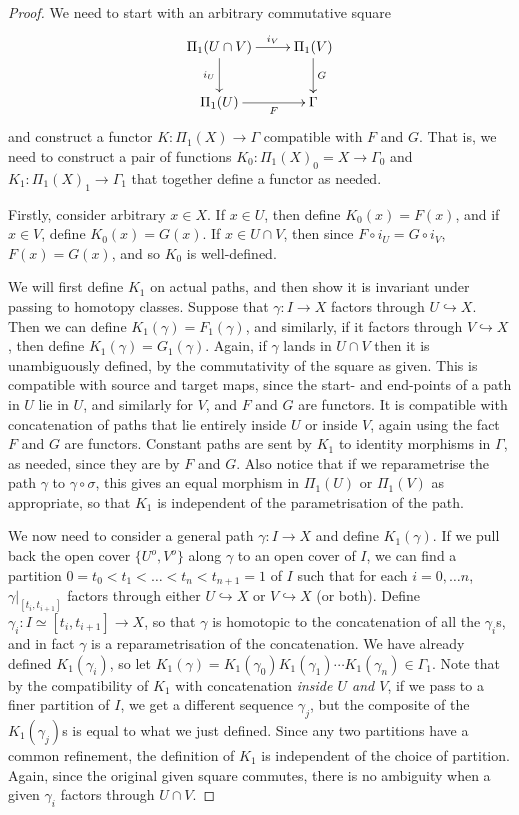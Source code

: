 \documentclass{tufte-handout}
\def\into {\hookrightarrow}
\theoremstyle{definition}
\begin{document}
\begin{proof}
We need to start with an arbitrary commutative square
\[
	\xymatrix{
		\Pi_1(U\cap V) \ar[r]^-{i_V} \ar[d]_{i_U} & \Pi_1(V) \ar[d]^G\\
		\Pi_1(U) \ar[r]_-F & \Gamma
	}
\]
and construct a functor $K\colon \Pi_1(X) \to \Gamma$ compatible with $F$ and $G$. That 
is, we need to construct a pair of functions $K_0\colon \Pi_1(X)_0 = X \to \Gamma_0$ and 
$K_1\colon \Pi_1(X)_1 \to \Gamma_1$ that together define a functor as needed.

Firstly, consider arbitrary $x\in X$. If $x\in U$, then define $K_0(x) = F(x)$, and if 
$x\in V$, define $K_0(x) = G(x)$. If $x\in U\cap V$, then since $F\circ i_U = G\circ 
i_V$, $F(x) = G(x)$, and so $K_0$ is well-defined.

We will first define $K_1$ on actual paths, and then show it is invariant under passing 
to homotopy classes. Suppose that $\gamma\colon I\to X$ factors through $U \into X$. 
Then we can define $K_1(\gamma) = F_1(\gamma)$, and similarly, if it factors through 
$V\into X$, then define $K_1(\gamma) = G_1(\gamma)$. Again, if $\gamma$ lands in $U\cap 
V$ then it is unambiguously defined, by the commutativity of the square as given. This 
is compatible with source and target maps, since the start- and end-points of a path in 
$U$ lie in $U$, and similarly for $V$, and $F$ and $G$ are functors. It is compatible 
with concatenation of paths that lie entirely inside $U$ or inside $V$, again using the 
fact $F$ and $G$ are functors. Constant paths are sent by $K_1$ to identity morphisms in 
$\Gamma$, as needed, since they are by $F$ and $G$. Also notice that if we reparametrise 
the path $\gamma$ to $\gamma\circ \sigma$, this gives an equal morphism in $\Pi_1(U)$ or 
$\Pi_1(V)$ as appropriate, so that $K_1$ is independent of the parametrisation of the 
path.

We now need to consider a general path $\gamma\colon I\to X$ and define $K_1(\gamma)$. 
If we pull back the open cover $\{U^o,V^o\}$ along $\gamma$ to an open cover of $I$, we 
can find a partition $0=t_0<t_1<\ldots < 
t_n<t_{n+1}=1$ of $I$ such that for each $i=0,\ldots n$, $\gamma\big|_{[t_i,t_{i+1}]}$ 
factors through either $U\into X$ or $V\into X$ (or both). Define $\gamma_i \colon I 
\simeq [t_i,t_{i+1}] \to X$, so that $\gamma$ is homotopic to the concatenation of all 
the $\gamma_i$s, and in fact $\gamma$ is a reparametrisation of the concatenation. We 
have already defined $K_1(\gamma_i)$, so let $K_1(\gamma) = 
K_1(\gamma_0)K_1(\gamma_1)\cdots K_1(\gamma_n) \in \Gamma_1$. Note that by the 
compatibility of $K_1$ with concatenation \emph{inside $U$ and $V$}, if we pass to a 
finer partition of $I$, we get a different sequence $\gamma_j$, but the composite of the 
$K_1(\gamma_j)$s is equal to what we just defined. Since any two partitions have a 
common refinement, the definition of $K_1$ is independent of the choice of partition. 
Again, since the original given square commutes, there is no ambiguity when a given 
$\gamma_i$ factors through $U\cap V$.


\end{proof}
\end{document}
